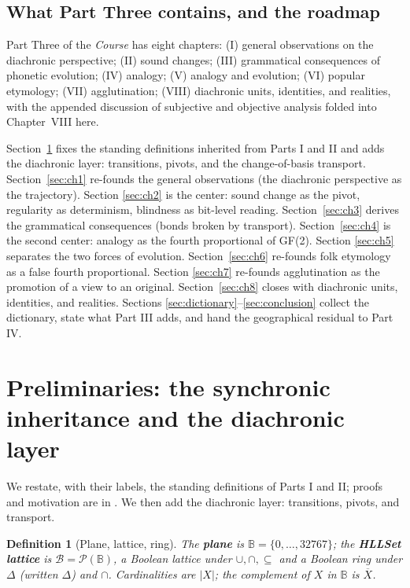 \documentclass[11pt,a4paper]{article}
\newtheorem{definition}[principle]{Definition}
\theoremstyle{remark}
\newcommand{\Plane}{\ensuremath{\mathbb{B}}}            %
\newcommand{\Lat}{\ensuremath{\mathcal{B}}}              %
\newcommand{\xor}{\ensuremath{\Delta}}                   %
\begin{document}
\subsection{What Part Three contains, and the roadmap}

Part Three of the \textit{Course} has eight chapters: (I) general
observations on the diachronic perspective; (II) sound changes; (III)
grammatical consequences of phonetic evolution; (IV) analogy; (V) analogy and
evolution; (VI) popular etymology; (VII) agglutination; (VIII) diachronic
units, identities, and realities, with the appended discussion of subjective
and objective analysis folded into Chapter~VIII here.

Section~\ref{sec:prelim} fixes the standing definitions inherited from Parts I
and II and adds the diachronic layer: transitions, pivots, and the
change-of-basis transport. Section~\ref{sec:ch1} re-founds the general
observations (the diachronic perspective as the trajectory). Section
\ref{sec:ch2} is the center: sound change as the pivot, regularity as
determinism, blindness as bit-level reading. Section~\ref{sec:ch3} derives the
grammatical consequences (bonds broken by transport). Section~\ref{sec:ch4}
is the second center: analogy as the fourth proportional of GF(2). Section
\ref{sec:ch5} separates the two forces of evolution. Section~\ref{sec:ch6}
re-founds folk etymology as a false fourth proportional. Section
\ref{sec:ch7} re-founds agglutination as the promotion of a view to an
original. Section~\ref{sec:ch8} closes with diachronic units, identities, and
realities. Sections \ref{sec:dictionary}--\ref{sec:conclusion} collect the
dictionary, state what Part III adds, and hand the geographical residual to
Part IV.

\section{Preliminaries: the synchronic inheritance and the diachronic layer}
\label{sec:prelim}

We restate, with their labels, the standing definitions of Parts I and II;
proofs and motivation are in \cite{part1,part2}. We then add the diachronic
layer: transitions, pivots, and transport.

\begin{definition}[Plane, lattice, ring]
\label{def:plane}
The \textbf{plane} is $\Plane = \{0,\dots,32767\}$; the \textbf{HLLSet
lattice} is $\Lat = \mathcal{P}(\Plane)$, a Boolean lattice under
$\cup,\cap,\subseteq$ and a Boolean ring under $\xor$ (written $\Delta$) and
$\cap$. Cardinalities are $|X|$; the complement of $X$ in $\Plane$ is
$\overline{X}$.
\end{definition}
\end{document}
